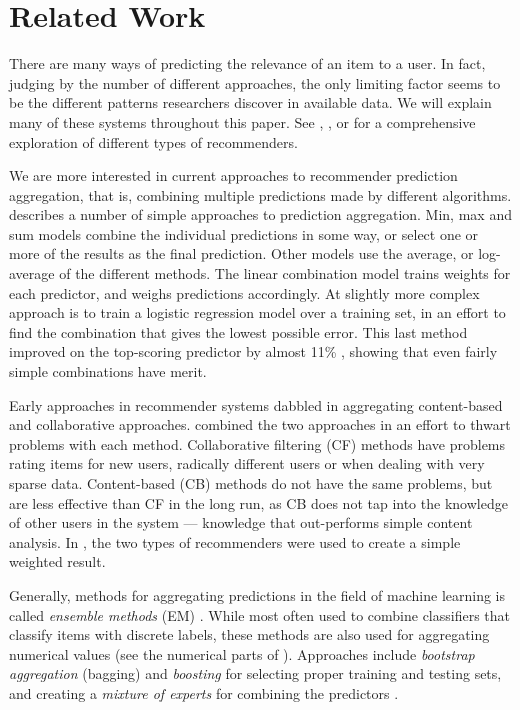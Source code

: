 \section{Related Work}

There are many ways of predicting the
relevance of an item to a user. 
In fact, judging by the number of different approaches,
the only limiting factor seems to be the different 
patterns researchers discover in available data.
We will explain many of these systems throughout this paper.
See 
\cite{Adomavicius2005}, \cite{Pazzani2007}, \cite{Schafer2007} 
or \cite{Bjorkoy2010d} for a comprehensive exploration 
of different types of recommenders.

We are more interested in current approaches to recommender prediction aggregation,
that is, combining multiple predictions made by different algorithms.
\cite{Aslam2001} describes a number of simple approaches to prediction aggregation.
Min, max and sum models combine the individual predictions in some way, 
or select one or more of the results as the final prediction. 
Other models use the average, or log-average of the different methods.
The linear combination model trains weights for each predictor, and weighs predictions accordingly.
At slightly more complex approach is to train a logistic regression model \cite[p3]{Aslam2001}
over a training set, in an effort to find the combination that gives the lowest possible error.
This last method improved on the top-scoring predictor by almost 11\% \cite[p3]{Aslam2001},
showing that even fairly simple combinations have merit.

Early approaches in recommender systems dabbled in aggregating content-based and collaborative approaches.
\cite{Claypool1999} combined the two approaches in an effort to thwart problems with each method.
Collaborative filtering (CF) methods have problems rating items for new users, radically different users or when dealing with very sparse data.
Content-based (CB) methods do not have the same problems, but are less effective than CF in the long run, as CB does not tap into the 
knowledge of other users in the system --- knowledge that out-performs simple content analysis.
In \cite{Claypool1999}, the two types of recommenders were used to create a simple weighted result.

Generally, methods for aggregating predictions in the field of machine learning is called \emph{ensemble methods} (EM) \cite[p1]{Dietterich2000}.
While most often used to combine classifiers that classify items with discrete labels,
these methods are also used for aggregating numerical values (see the numerical parts of \cite{Breiman1996}).
Approaches include \emph{bootstrap aggregation} (bagging) and \emph{boosting} 
for selecting proper training and testing sets,
and creating a \emph{mixture of experts} for combining the predictors
\cite[p27]{Polikar2006}.

